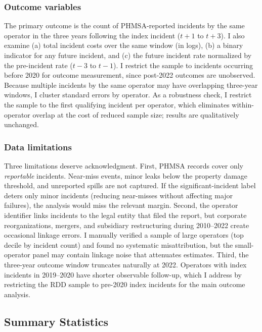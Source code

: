 \documentclass[12pt]{article}
\begin{document}
\subsubsection*{Outcome variables} The primary outcome is the count of PHMSA-reported incidents by the same operator in the three years following the index incident ($t+1$ to $t+3$). I also examine (a) total incident costs over the same window (in logs), (b) a binary indicator for any future incident, and (c) the future incident rate normalized by the pre-incident rate ($t-3$ to $t-1$). I restrict the sample to incidents occurring before 2020 for outcome measurement, since post-2022 outcomes are unobserved. Because multiple incidents by the same operator may have overlapping three-year windows, I cluster standard errors by operator. As a robustness check, I restrict the sample to the first qualifying incident per operator, which eliminates within-operator overlap at the cost of reduced sample size; results are qualitatively unchanged.

\subsubsection*{Data limitations} Three limitations deserve acknowledgment. First, PHMSA records cover only \textit{reportable} incidents. Near-miss events, minor leaks below the property damage threshold, and unreported spills are not captured. If the significant-incident label deters only minor incidents (reducing near-misses without affecting major failures), the analysis would miss the relevant margin. Second, the operator identifier links incidents to the legal entity that filed the report, but corporate reorganizations, mergers, and subsidiary restructuring during 2010--2022 create occasional linkage errors. I manually verified a sample of large operators (top decile by incident count) and found no systematic misattribution, but the small-operator panel may contain linkage noise that attenuates estimates. Third, the three-year outcome window truncates naturally at 2022. Operators with index incidents in 2019--2020 have shorter observable follow-up, which I address by restricting the RDD sample to pre-2020 index incidents for the main outcome analysis.

\subsection{Summary Statistics}


\end{document}
